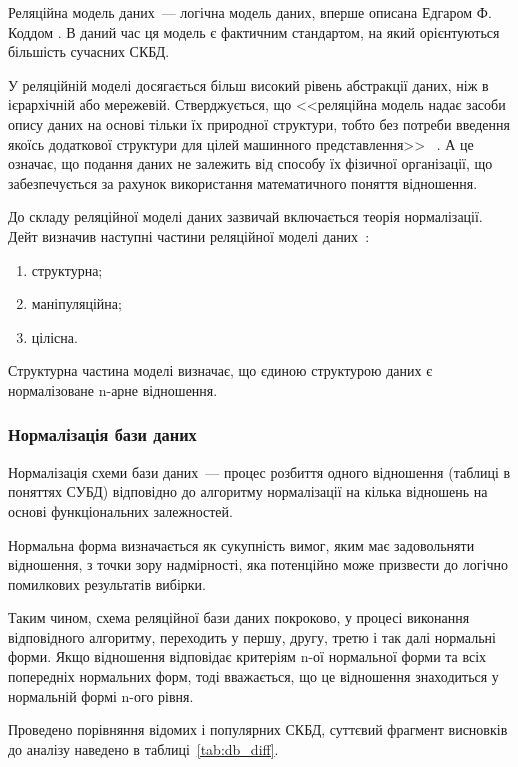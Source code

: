 Реляційна модель даних~--- логічна модель даних, вперше описана Едгаром Ф. Коддом \cite{codd1970relational}. В даний час ця модель є фактичним стандартом, на який орієнтуються більшість сучасних СКБД.

У реляційній моделі досягається більш високий рівень абстракції даних, ніж в ієрархічній або мережевій. Стверджується, що <<реляційна модель надає засоби опису даних на основі тільки їх природної структури, тобто без потреби введення якоїсь додаткової структури для цілей машинного представлення>>~ \cite{codd1970relational}. А це означає, що подання даних не залежить від способу їх фізичної організації, що забезпечується за рахунок використання математичного поняття відношення.

До складу реляційної моделі даних зазвичай включається теорія нормалізації. Дейт визначив наступні частини реляційної моделі даних~\cite{дейт2008введение}:
\begin{enumerate}
	\item структурна;
	\item маніпуляційна;
	\item цілісна.
\end{enumerate}

Структурна частина моделі визначає, що єдиною структурою даних є нормалізоване n-арне відношення.

\subsubsection{Нормалізація бази даних}

Нормалізація схеми бази даних~--- процес розбиття одного відношення (таблиці в поняттях СУБД) відповідно до алгоритму нормалізації на кілька відношень на основі функціональних залежностей.

Нормальна форма визначається як сукупність вимог, яким має задовольняти відношення, з точки зору надмірності, яка потенційно може призвести до логічно помилкових результатів вибірки.

Таким чином, схема реляційної бази даних покроково, у процесі виконання відповідного алгоритму, переходить у першу, другу, третю і так далі нормальні форми. Якщо відношення відповідає критеріям n-ої нормальної форми та всіх попередніх нормальних форм, тоді вважається, що це відношення знаходиться у нормальній формі n-ого рівня.

Проведено порівняння відомих і популярних СКБД, суттєвий фрагмент висновків до аналізу наведено в таблиці~\ref{tab:db_diff}.

